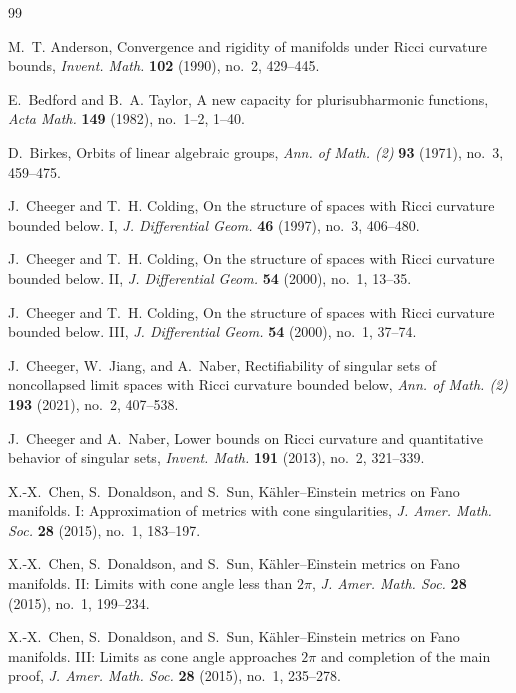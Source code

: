 \documentclass[11pt]{amsart}
\theoremstyle{definition}
\theoremstyle{remark}
\begin{document}
\begin{thebibliography}{99}

M.~T. Anderson,
\newblock Convergence and rigidity of manifolds under Ricci curvature bounds,
\newblock \emph{Invent. Math.} \textbf{102} (1990), no.~2, 429--445.

E.~Bedford and B.~A. Taylor,
\newblock A new capacity for plurisubharmonic functions,
\newblock \emph{Acta Math.} \textbf{149} (1982), no.~1--2, 1--40.

D.~Birkes,
\newblock Orbits of linear algebraic groups,
\newblock \emph{Ann. of Math. (2)} \textbf{93} (1971), no.~3, 459--475.

J.~Cheeger and T.~H. Colding,
\newblock On the structure of spaces with Ricci curvature bounded below. I,
\newblock \emph{J. Differential Geom.} \textbf{46} (1997), no.~3, 406--480.

J.~Cheeger and T.~H. Colding,
\newblock On the structure of spaces with Ricci curvature bounded below. II,
\newblock \emph{J. Differential Geom.} \textbf{54} (2000), no.~1, 13--35.

J.~Cheeger and T.~H. Colding,
\newblock On the structure of spaces with Ricci curvature bounded below. III,
\newblock \emph{J. Differential Geom.} \textbf{54} (2000), no.~1, 37--74.

J.~Cheeger, W.~Jiang, and A.~Naber,
\newblock Rectifiability of singular sets of noncollapsed limit spaces with
Ricci curvature bounded below,
\newblock \emph{Ann. of Math. (2)} \textbf{193} (2021), no.~2, 407--538.

J.~Cheeger and A.~Naber,
\newblock Lower bounds on Ricci curvature and quantitative behavior of singular sets,
\newblock \emph{Invent. Math.} \textbf{191} (2013), no.~2, 321--339.

X.-X.~Chen, S.~Donaldson, and S.~Sun,
\newblock K\"ahler--Einstein metrics on Fano manifolds. I:
Approximation of metrics with cone singularities,
\newblock \emph{J. Amer. Math. Soc.} \textbf{28} (2015), no.~1, 183--197.

X.-X.~Chen, S.~Donaldson, and S.~Sun,
\newblock K\"ahler--Einstein metrics on Fano manifolds. II:
Limits with cone angle less than $2\pi$,
\newblock \emph{J. Amer. Math. Soc.} \textbf{28} (2015), no.~1, 199--234.

X.-X.~Chen, S.~Donaldson, and S.~Sun,
\newblock K\"ahler--Einstein metrics on Fano manifolds. III:
Limits as cone angle approaches $2\pi$ and completion of the main proof,
\newblock \emph{J. Amer. Math. Soc.} \textbf{28} (2015), no.~1, 235--278.


\end{thebibliography}
\end{document}
